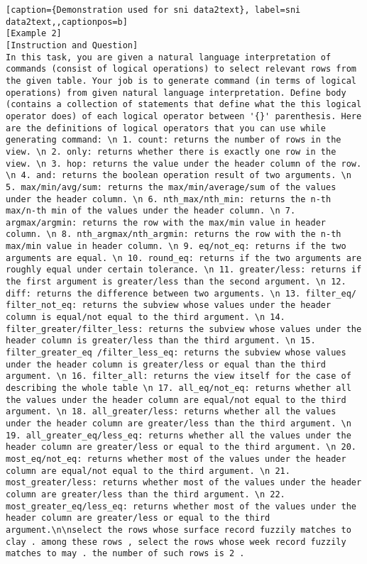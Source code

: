 \begin{lstlisting}[caption={Demonstration used for sni data2text}, label=sni data2text,,captionpos=b]
[Example 2]
[Instruction and Question]
In this task, you are given a natural language interpretation of commands (consist of logical operations) to select relevant rows from the given table. Your job is to generate command (in terms of logical operations) from given natural language interpretation. Define body (contains a collection of statements that define what the this logical operator does) of each logical operator between '{}' parenthesis. Here are the definitions of logical operators that you can use while generating command: \n 1. count: returns the number of rows in the view. \n 2. only: returns whether there is exactly one row in the view. \n 3. hop: returns the value under the header column of the row. \n 4. and: returns the boolean operation result of two arguments. \n 5. max/min/avg/sum: returns the max/min/average/sum of the values under the header column. \n 6. nth_max/nth_min: returns the n-th max/n-th min of the values under the header column. \n 7. argmax/argmin: returns the row with the max/min value in header column. \n 8. nth_argmax/nth_argmin: returns the row with the n-th max/min value in header column. \n 9. eq/not_eq: returns if the two arguments are equal. \n 10. round_eq: returns if the two arguments are roughly equal under certain tolerance. \n 11. greater/less: returns if the first argument is greater/less than the second argument. \n 12. diff: returns the difference between two arguments. \n 13. filter_eq/ filter_not_eq: returns the subview whose values under the header column is equal/not equal to the third argument. \n 14. filter_greater/filter_less: returns the subview whose values under the header column is greater/less than the third argument. \n 15. filter_greater_eq /filter_less_eq: returns the subview whose values under the header column is greater/less or equal than the third argument. \n 16. filter_all: returns the view itself for the case of describing the whole table \n 17. all_eq/not_eq: returns whether all the values under the header column are equal/not equal to the third argument. \n 18. all_greater/less: returns whether all the values under the header column are greater/less than the third argument. \n 19. all_greater_eq/less_eq: returns whether all the values under the header column are greater/less or equal to the third argument. \n 20. most_eq/not_eq: returns whether most of the values under the header column are equal/not equal to the third argument. \n 21. most_greater/less: returns whether most of the values under the header column are greater/less than the third argument. \n 22. most_greater_eq/less_eq: returns whether most of the values under the header column are greater/less or equal to the third argument.\n\nselect the rows whose surface record fuzzily matches to clay . among these rows , select the rows whose week record fuzzily matches to may . the number of such rows is 2 .


\end{lstlisting}
